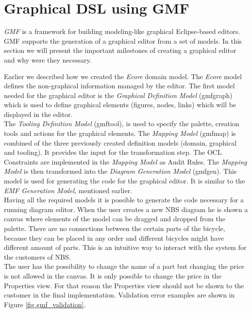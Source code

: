 \section{Graphical DSL using GMF}
\label{sec.gmf}

\noindent \emph{GMF} is a framework for
building modeling-like graphical Eclipse-based editors.
\cite{Article_Introducing_GMF} GMF supports the generation of a graphical editor
from a set of models. In this section we will present the important
milestones of creating a graphical editor and why were they necessary. 

\noindent Earlier we described how we created the \emph{Ecore} domain model. The
\emph{Ecore} model defines the non-graphical information managed by the editor. The first
model needed for the graphical editor is the \emph{Graphical Definition Model}
(gmfgraph) which is used to define graphical elements (figures, nodes, links)
which will be displayed in the editor. \\

\noindent The \emph{Tooling Definition Model} (gmftool),
is used to specify the palette, creation tools and actions for the
graphical elements. The \emph{Mapping Model} (gmfmap) is combined of the
three previously created definition models (domain, graphical and tooling).
It provides the input for the transformation step. The OCL Constraints are
implemented in the \emph{Mapping Model} as Audit Rules. The \emph{Mapping Model}
is then transformed into the \emph{Diagram Generation Model} (gmfgen). This
model is used for generating the code for the graphical editor. It is similar to
the \emph{EMF Generation Model}, mentioned earlier. \cite{GMF_Tutorial}\\

\noindent Having all the required models it is possible to generate the code
necessary for a running diagram editor. When the user creates a new NBS diagram he is
shown a canvas where elements of the model can be dragged and dropped from the
palette. There are no connections between the certain parts
of the bicycle, because they can be placed in any order and different bicycles
might have different amount of parts. This is an intuitive way to interact
with the system for the customers of NBS.\\

\noindent The user has the possibility to change the name of a part but changing
the price is not allowed in the canvas. It is only possible to change the
price in the Properties view. For that reason the Properties view should not be
shown to the customer in the final implementation.  
Validation error examples are shown in Figure \ref{fig.gmf_validation}.\\

